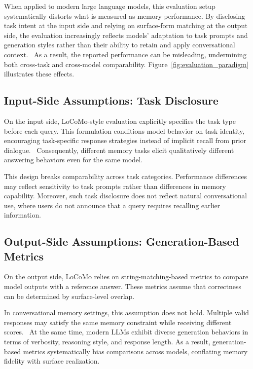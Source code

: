 \documentclass[11pt]{article}
\begin{document}
When applied to modern large language models, this evaluation setup
systematically distorts what is measured as memory performance.
By disclosing task intent at the input side and relying on surface-form
matching at the output side, the evaluation increasingly reflects
models’ adaptation to task prompts and generation styles rather than
their ability to retain and apply conversational context.~\cite{perez2021true,min2022rethinking,shi2023large}
As a result, the reported performance can be misleading, undermining
both cross-task and cross-model comparability.
Figure~\ref{fig:evaluation_paradigm} illustrates these effects.

\subsection{Input-Side Assumptions: Task Disclosure}

On the input side, LoCoMo-style evaluation explicitly specifies the task
type before each query.
This formulation conditions model behavior on task identity, encouraging
task-specific response strategies instead of implicit recall from prior
dialogue.~\cite{perez2021true,min2022rethinking}
Consequently, different memory tasks elicit qualitatively different
answering behaviors even for the same model.

This design breaks comparability across task categories.
Performance differences may reflect sensitivity to task prompts rather
than differences in memory capability.
Moreover, such task disclosure does not reflect natural conversational
use, where users do not announce that a query requires recalling earlier
information.~\cite{reddy2019coqa,xu2022beyond}

\subsection{Output-Side Assumptions: Generation-Based Metrics}

On the output side, LoCoMo relies on string-matching-based metrics to
compare model outputs with a reference answer.
These metrics assume that correctness can be determined by surface-level
overlap.~\cite{bulian2022tomayto,novikova2017we}

In conversational memory settings, this assumption does not hold.
Multiple valid responses may satisfy the same memory constraint while
receiving different scores.~\cite{bulian2022tomayto,post2018call}
At the same time, modern LLMs exhibit diverse generation behaviors in
terms of verbosity, reasoning style, and response length.
As a result, generation-based metrics systematically bias comparisons
across models, conflating memory fidelity with surface realization.
~\cite{zheng2023judging,li2024llms}
\end{document}
